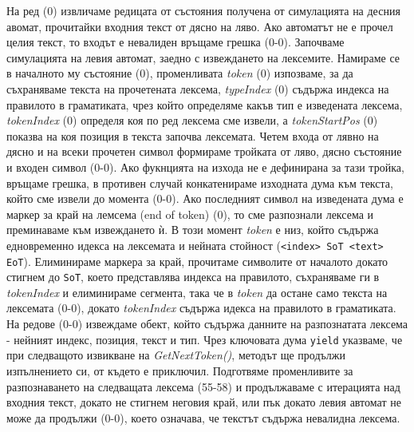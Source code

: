 \documentclass[12pt, oneside]{article}
\theoremstyle{definition}
\begin{document}
На ред (0) извличаме редицата от състояния получена от симулацията на десния авомат, прочитайки входния текст от дясно на ляво. Ако автоматът не е прочел целия текст, то входът е невалиден връщаме грешка (0-0). Започваме симулацията на левия автомат, заедно с извеждането на лексемите. Намираме се в началното му състояние (0), променливата \emph{token} (0) изпозваме, за да съхраняваме текста на прочетената лексема, \emph{typeIndex} (0) съдържа индекса на правилото в граматиката, чрез който определяме какъв тип е изведената лексема, \emph{tokenIndex} (0) определя коя по ред лексема сме извели, а \emph{tokenStartPos} (0) показва на коя позиция в текста започва лексемата. Четем входа от лявно на дясно и на всеки прочетен символ формираме тройката от ляво, дясно състояние и входен символ (0-0). Ако фукнцията на изхода не е дефинирана за тази тройка, връщаме грешка, в противен случай конкатенираме изходната дума към текста, който сме извели до момента (0-0). Ако последният символ на изведената дума е маркер за край на лемсема (end of token) (0), то сме разпознали лексема и преминаваме към извеждането ѝ. В този момент \emph{token} е низ, който съдържа едновременно идекса на лексемата и нейната стойност (\verb/<index> SoT <text> EoT/). Елиминираме маркера за край, прочитаме символите от началото докато стигнем до \verb/SoT/, което представлява индекса на правилото, съхраняваме ги в \emph{tokenIndex} и елиминираме сегмента, така че в \emph{token} да остане само текста на лексемата (0-0), докато \emph{tokenIndex} съдържа идекса на правилото в граматиката.  На редове (0-0) извеждаме обект, който съдържа данните на разпознатата лексема - нейният индекс, позиция, текст и тип. Чрез ключовата дума \verb/yield/ указваме, че при следващото извикване на \emph{GetNextToken()}, методът ще продължи изпълнението си, от където е приключил. Подготвяме променливите за разпознаването на следващата лексема (55-58) и продължаваме с итерацията над входния текст, докато не стигнем неговия край, или пък докато левия автомат не може да продължи (0-0), което означава, че текстът съдържа невалидна лексема.
\end{document}
